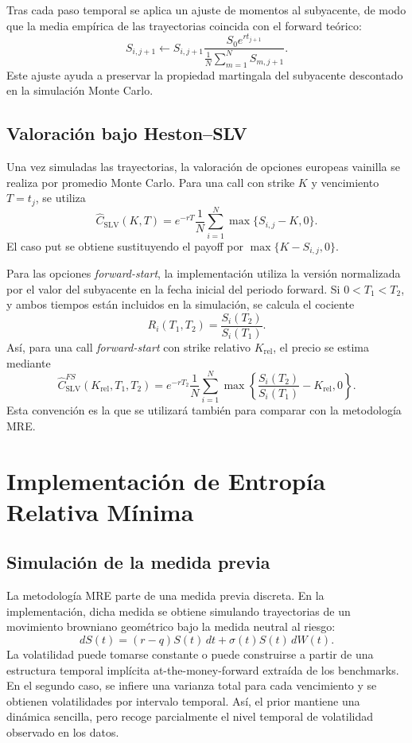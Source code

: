 Tras cada paso temporal se aplica un ajuste de momentos al subyacente, de modo que la media empírica de las trayectorias coincida con el forward teórico:
\[
S_{i,j+1}
\leftarrow
S_{i,j+1}
\frac{S_0e^{rt_{j+1}}}{\frac{1}{N}\sum_{m=1}^N S_{m,j+1}}.
\]
Este ajuste ayuda a preservar la propiedad martingala del subyacente descontado en la simulación Monte Carlo.

\subsection{Valoración bajo Heston--SLV}

Una vez simuladas las trayectorias, la valoración de opciones europeas vainilla se realiza por promedio Monte Carlo. Para una call con strike \(K\) y vencimiento \(T=t_j\), se utiliza
\begin{equation}
\label{eq:impl_slv_vanilla}
\widehat{C}_{\mathrm{SLV}}(K,T)
=
e^{-rT}
\frac{1}{N}
\sum_{i=1}^{N}
\max\{S_{i,j}-K,0\}.
\end{equation}
El caso put se obtiene sustituyendo el payoff por \(\max\{K-S_{i,j},0\}\).\medskip

Para las opciones \textit{forward-start}, la implementación utiliza la versión normalizada por el valor del subyacente en la fecha inicial del periodo forward. Si \(0<T_1<T_2\), y ambos tiempos están incluidos en la simulación, se calcula el cociente
\[
R_i(T_1,T_2)
=
\frac{S_i(T_2)}{S_i(T_1)}.
\]
Así, para una call \textit{forward-start} con strike relativo \(K_{\mathrm{rel}}\), el precio se estima mediante
\begin{equation}
\label{eq:impl_slv_forward}
\widehat{C}_{\mathrm{SLV}}^{FS}(K_{\mathrm{rel}},T_1,T_2)
=
e^{-rT_2}
\frac{1}{N}
\sum_{i=1}^{N}
\max\left\{
\frac{S_i(T_2)}{S_i(T_1)}
-
K_{\mathrm{rel}},
0
\right\}.
\end{equation}
Esta convención es la que se utilizará también para comparar con la metodología MRE.

\section{Implementación de Entropía Relativa Mínima}

\subsection{Simulación de la medida previa}

La metodología MRE parte de una medida previa discreta. En la implementación, dicha medida se obtiene simulando trayectorias de un movimiento browniano geométrico bajo la medida neutral al riesgo:
\begin{equation}
\label{eq:impl_mre_prior}
dS(t)=(r-q)S(t)\,dt+\sigma(t)S(t)\,dW(t).
\end{equation}
La volatilidad puede tomarse constante o puede construirse a partir de una estructura temporal implícita at-the-money-forward extraída de los benchmarks. En el segundo caso, se infiere una varianza total para cada vencimiento y se obtienen volatilidades por intervalo temporal. Así, el prior mantiene una dinámica sencilla, pero recoge parcialmente el nivel temporal de volatilidad observado en los datos.\medskip

